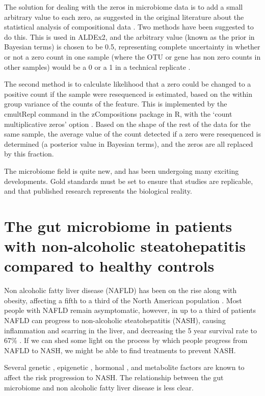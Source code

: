 The solution for dealing with the zeros in microbiome data is to add a small arbitrary value to each zero, as suggested in the original literature about the statistical analysis of compositional data \cite{aitchison1982statistical}. Two methods have been suggested to do this. This is used in ALDEx2, and the arbitrary value (known as the prior in Bayesian terms) is chosen to be 0.5, representing complete uncertainty in whether or not a zero count in one sample (where the OTU or gene has non zero counts in other samples) would be a 0 or a 1 in a technical replicate \cite{fernandes2013anova}.

The second method is to calculate likelihood that a zero could be changed to a positive count if the sample were resequenced is estimated, based on the within group variance of the counts of the feature. This is implemented by the cmultRepl command in the zCompositions package in R, with the `count multiplicative zeros' option \cite{palarea2015zcompositions}. Based on the shape of the rest of the data for the same sample, the average value of the count detected if a zero were resequenced is determined (a posterior value in Bayesian terms), and the zeros are all replaced by this fraction.

The microbiome field is quite new, and has been undergoing many exciting developments. Gold standards must be set to ensure that studies are replicable, and that published research represents the biological reality.

\section{The gut microbiome in patients with non-alcoholic steatohepatitis compared to healthy controls}

Non alcoholic fatty liver disease (NAFLD) has been on the rise along with obesity, affecting a fifth to a third of the North American population \cite{preiss2008non}. Most people with NAFLD remain asymptomatic, however, in up to a third of patients NAFLD can progress to non-alcoholic steatohepatitis (NASH), causing inflammation and scarring in the liver, and decreasing the 5 year survival rate to 67\% \cite{propst1995prognosis}. If we can shed some light on the process by which people progress from NAFLD to NASH, we might be able to find treatments to prevent NASH.

Several genetic \cite{sookoian2011meta} \cite{rivera2007toll}, epigenetic \cite{murphy2013relationship}, hormonal \cite{yasuda1999suppressive}, and metabolite \cite{raman2013fecal} factors are known to affect the risk progression to NASH. The relationship between the gut microbiome and non alcoholic fatty liver disease is less clear.

